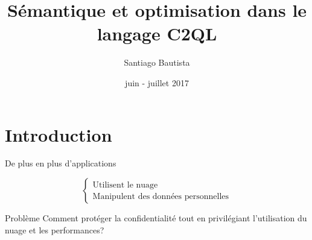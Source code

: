 \documentclass{beamer}
\begin{document}
\author{Santiago Bautista}
\title{Sémantique et optimisation dans le  langage C2QL}
\date{juin - juillet 2017}



\begin{frame}
\titlepage
\end{frame}

\section{Introduction}
\begin{frame}
De plus en plus d'applications

$$
\left\lbrace
\begin{array}{l}
\text{Utilisent le nuage} \\
\text{Manipulent des données personnelles}
\end{array}
\right.
$$
\end{frame}

\begin{frame}
\begin{block}{Problème}
Comment protéger la confidentialité
tout en privilégiant l'utilisation du nuage et les performances?
\end{block}
\end{frame}

\begin{frame}
\tableofcontents
\end{frame}
\end{document}
